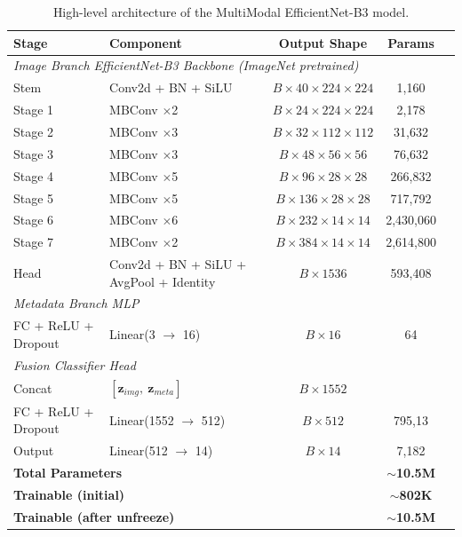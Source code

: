 \begin{table}[ht]
\centering
\caption{High-level architecture of the MultiModal EfficientNet-B3 model.}
\label{tab:arch_highlevel}
\renewcommand{\arraystretch}{1.3}
\begin{tabular}{llccc}
\toprule
\textbf{Stage} & \textbf{Component} & \textbf{Output Shape} & \textbf{Params} \\
\midrule
\multicolumn{5}{l}{\textit{Image Branch EfficientNet-B3 Backbone (ImageNet pretrained)}} \\
\midrule
Stem        & Conv2d + BN + SiLU          & $B \times 40 \times 224 \times 224$   & 1,160  \\
Stage 1     & MBConv $\times$2            & $B \times 24 \times 224 \times 224$   & 2,178 \\
Stage 2     & MBConv $\times$3            & $B \times 32 \times 112 \times 112$   & 31,632 \\
Stage 3     & MBConv $\times$3            & $B \times 48 \times 56 \times 56$     & 76,632 \\
Stage 4     & MBConv $\times$5            & $B \times 96 \times 28 \times 28$     & 266,832\\
Stage 5     & MBConv $\times$5            & $B \times 136 \times 28 \times 28$    & 717,792 \\
Stage 6     & MBConv $\times$6            & $B \times 232 \times 14 \times 14$    & 2,430,060\\
Stage 7     & MBConv $\times$2            & $B \times 384 \times 14 \times 14$    & 2,614,800\\
Head        & Conv2d + BN + SiLU + AvgPool + Identity & $B \times 1536$        & 593,408 \\
\midrule
\multicolumn{5}{l}{\textit{Metadata Branch MLP}} \\
\midrule
FC + ReLU + Dropout & Linear(3 $\to$ 16) & $B \times 16$   & 64 \\
\midrule
\multicolumn{5}{l}{\textit{Fusion Classifier Head}} \\
\midrule
Concat      & $[\mathbf{z}_{img},\ \mathbf{z}_{meta}]$ & $B \times 1552$\\
FC + ReLU + Dropout & Linear(1552 $\to$ 512) & $B \times 512$ & 795,13 \\
Output      & Linear(512 $\to$ 14)    & $B \times 14$           & 7,182  \\
\midrule
\multicolumn{2}{l}{\textbf{Total Parameters}}       & & \textbf{$\sim$10.5M} & \\
\multicolumn{2}{l}{\textbf{Trainable (initial)}}    & & \textbf{$\sim$802K}  & \\
\multicolumn{2}{l}{\textbf{Trainable (after unfreeze)}} & & \textbf{$\sim$10.5M} & \\
\bottomrule
\end{tabular}
\end{table}


